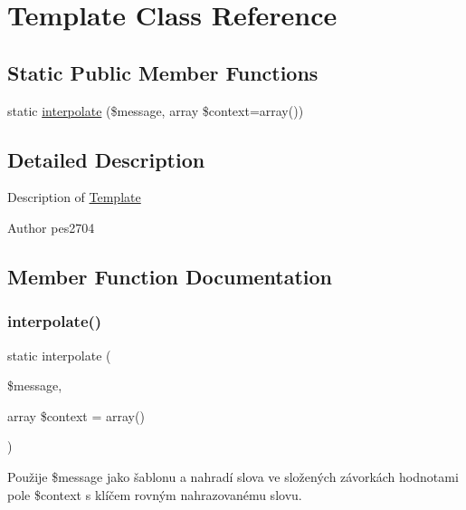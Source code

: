 \hypertarget{class_pes_1_1_text_1_1_template}{}\section{Template Class Reference}
\label{class_pes_1_1_text_1_1_template}
\subsection*{Static Public Member Functions}
\begin{DoxyCompactItemize}
\item 
static \mbox{\hyperlink{class_pes_1_1_text_1_1_template_aea570e655131784faa991b5772448691}{interpolate}} (\$message, array \$context=array())
\end{DoxyCompactItemize}


\subsection{Detailed Description}
Description of \mbox{\hyperlink{class_pes_1_1_text_1_1_template}{Template}}

\begin{DoxyAuthor}{Author}
pes2704 
\end{DoxyAuthor}


\subsection{Member Function Documentation}
\mbox{\label{class_pes_1_1_text_1_1_template_aea570e655131784faa991b5772448691}} 
\subsubsection{\texorpdfstring{interpolate()}{interpolate()}}
{\footnotesize\ttfamily static interpolate (\begin{DoxyParamCaption}\item[{}]{\$message,  }\item[{array}]{\$context = {\ttfamily array()} }\end{DoxyParamCaption})\hspace{0.3cm}{\ttfamily [static]}}

Použije \$message jako šablonu a nahradí slova ve složených závorkách hodnotami pole \$context s klíčem rovným nahrazovanému slovu.


